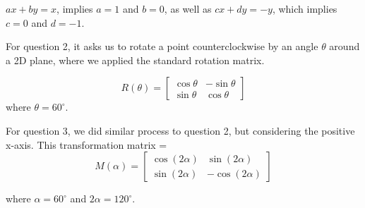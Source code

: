\documentclass{ximera}
\begin{document}
\begin{enumerate}
$ax+by=x$, implies $a=1$ and $b=0$, as well as $cx+dy=-y$, which implies $c = 0$ and $d= -1$.  

For question 2, it asks us to rotate a point counterclockwise by an angle $\theta$ around a 2D plane, where we applied the standard rotation matrix. 

$$R(\theta)= \left[ \begin{array}{cc}
   \cos\theta  & -\sin\theta \\
   \sin\theta  & \cos\theta
\end{array} \right]$$
where $\theta= 60^\circ$.

For question 3, we did similar process to question 2, but considering the positive x-axis. This transformation matrix = $$M(\alpha)= \left[ \begin{array}{cc}
   \cos(2\alpha)  & \sin(2\alpha) \\
    \sin(2\alpha) & -\cos(2\alpha)
\end{array}{} \right]$$

where $\alpha= 60^\circ$  and $2\alpha= 120^\circ$.

\end{enumerate}
\end{document}
